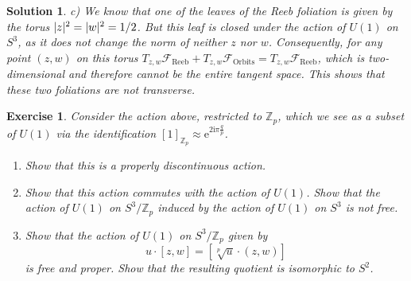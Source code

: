 \documentclass{article}
\newtheorem{ex}{Exercise}
\theoremstyle{nonumberplain}
\newtheorem{sol}{Solution}
\newcommand{\Z}{\mathbb{Z}}
\newcommand{\FF}{\mathcal{F}}
\newcommand{\I}{\mathrm{i}}
\newcommand{\e}{\mathrm{e}}
\DeclarePairedDelimiter{\norm}{\lvert}{\rvert}
\begin{document}
\begin{sol}
\medskip

c) We know that one of the leaves of the Reeb foliation is given by the torus $\norm z^2 = \norm w^2 = 1/2$. But this leaf is closed under the action of $U(1)$ on $S^3$, as it does not change the norm of neither $z$ nor $w$. Consequently, for any point $(z,w)$ on this torus $T_{z,w} \FF_{\text{Reeb}} + T_{z,w} \FF_{\text{Orbits}} = T_{z,w} \FF_{\text{Reeb}}$, which is two-dimensional and therefore cannot be the entire tangent space. This shows that these two foliations are not transverse.

\end{sol}

\begin{ex}
Consider the action above, restricted to $\Z_p$, which we see as a subset of $U(1)$ via the identification $[1]_{\Z_p} \approx \e^{2 \I \pi \frac qp}$.

\begin{enumerate}
\item Show that this is a properly discontinuous action.

\item Show that this action commutes with the action of $U(1)$. Show that the action of $U(1)$ on $S^3/\Z_p$ induced by the action of $U(1)$ on $S^3$ is not free.

\item Show that the action of $U(1)$ on $S^3/\Z_p$ given by
\[u \cdot [z,w] = [\sqrt[p]{u} \cdot (z,w)]\]
is free and proper. Show that the resulting quotient is isomorphic to $S^2$.
\end{enumerate}
\end{ex}
\end{document}
